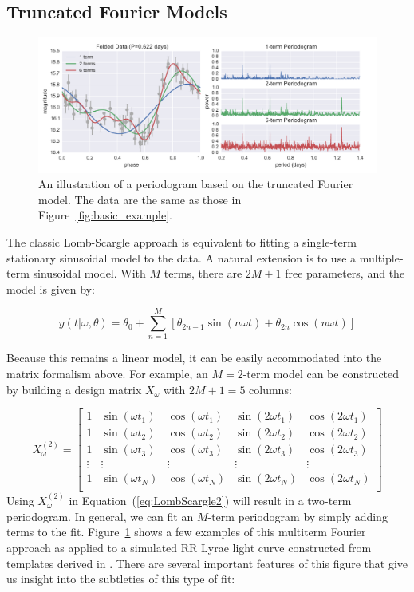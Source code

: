 \documentclass[12pt,preprint]{aastex}
\newcommand{\Fig}[1]{Figure~\ref{fig:#1}}
\newcommand{\fig}[1]{\Fig{#1}}
\newcommand{\figlabel}[1]{\label{fig:#1}}
\newcommand{\Eq}[1]{Equation~(\ref{eq:#1})}
\newcommand{\eq}[1]{\Eq{#1}}
\newcommand{\sectlabel}[1]{\label{sect:#1}}
\begin{document}
\subsection{Truncated Fourier Models}
\sectlabel{multiterm}

\begin{figure}
  \centering
  \includegraphics[width=\textwidth]{fig03.pdf}
  \caption{
    An illustration of a periodogram based on the truncated Fourier model. The data are the same as those in \fig{basic_example}. 
  }
  \figlabel{multiterm_example}
\end{figure}

The classic Lomb-Scargle approach is equivalent to fitting a single-term stationary sinusoidal model to the data. A natural extension is to use a multiple-term sinusoidal model. With $M$ terms, there are $2M + 1$ free parameters, and the model is given by:

\begin{equation}
  y(t|\omega,\theta) = \theta_0 + \sum_{n=1}^M \left[\theta_{2n - 1}\sin(n\omega t) + \theta_{2n}\cos(n\omega t)\right]
\end{equation}

Because this remains a linear model, it can be easily accommodated into the matrix formalism above. For example, an $M = 2$-term model can be constructed by building a design matrix $X_\omega$ with $2M + 1 = 5$ columns:

\begin{equation}
X_\omega^{(2)} = \left[
\begin{array}{ccccc}
1 & \sin(\omega t_1) & \cos(\omega t_1) & \sin(2\omega t_1) & \cos(2\omega t_1)\\
1 & \sin(\omega t_2) & \cos(\omega t_2) & \sin(2\omega t_2) & \cos(2\omega t_2)\\
1 & \sin(\omega t_3) & \cos(\omega t_3) & \sin(2\omega t_3) & \cos(2\omega t_3)\\
\vdots & \vdots & \vdots & \vdots & \vdots \\
1 & \sin(\omega t_N) & \cos(\omega t_N) & \sin(2\omega t_N) & \cos(2\omega t_N)\\
\end{array}
\right]
\end{equation}
Using $X_\omega^{(2)}$ in \eq{LombScargle2} will result in a two-term periodogram. In general, we can fit an $M$-term periodogram by simply adding terms to the fit. \fig{multiterm_example} shows a few examples of this multiterm Fourier approach as applied to a simulated RR Lyrae light curve constructed from templates derived in \citet{Sesar2010}. There are several important features of this figure that give us insight into the subtleties of this type of fit:
\end{document}
